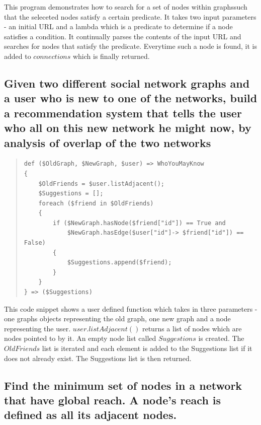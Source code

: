 \documentclass[a4paper]{article}
\begin{document}
\noindent This program demonstrates how to search for a set of nodes within graphssuch that the seleceted nodes satisfy a certain predicate. It takes two input parameters - an initial URL and a lambda which is a predicate to determine if a node satisfies a condition. It continually parses the contents of the input URL and searches for nodes that satisfy the predicate. Everytime such a node is found, it is added to $connections$ which is finally returned.
\newline

\subsection{Given two different social network graphs and a user who is new to one of the networks, build a recommendation system that tells the user who all on this new network he might now, by analysis of overlap of the two networks}

\begin{quote}
\begin{verbatim}
def ($OldGraph, $NewGraph, $user) => WhoYouMayKnow
{
    $OldFriends = $user.listAdjacent();
    $Suggestions = [];
    foreach ($friend in $OldFriends)
    {
        if ($NewGraph.hasNode($friend["id"]) == True and 
        	$NewGraph.hasEdge($user["id"]-> $friend["id"]) == False)
        {
        	$Suggestions.append($friend);
        }
    }
} => ($Suggestions)
\end{verbatim}
\end{quote}

\noindent This code snippet shows a user defined function which takes in three parameters - one graphs objects representing the old graph, one new graph and a node representing the user.
$user.listAdjacent()$ returns a list of nodes which are nodes pointed to by it. An empty node list called $Suggestions$ is created.
The $OldFriends$ list is iterated and each element is added to the Suggestions list if it does not already exist. The Suggestions list is then returned.
\newline

\subsection{Find the minimum set of nodes in a network that have global reach. A node's reach is defined as all its adjacent nodes.}
\end{document}
